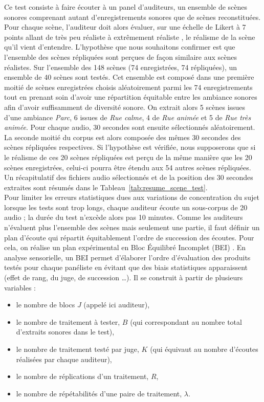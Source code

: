 Ce test consiste à faire écouter à un panel d'auditeurs, un ensemble de scènes sonores comprenant autant d'enregistrements sonores que de scènes reconstituées. Pour chaque scène, l'auditeur doit alors évaluer, sur une échelle de Likert à 7 points allant de \og très peu réaliste \fg{} à \og extrêmement réaliste \fg{}, le réalisme de la scène qu'il vient d'entendre. L'hypothèse que nous souhaitons confirmer est que l'ensemble des scènes répliquées sont perçues de façon similaire aux scènes réalistes.
Sur l'ensemble des 148 scènes (74 enregistrées, 74 répliquées), un ensemble de 40 scènes sont testés.
Cet ensemble est composé dans une première moitié de scènes enregistrées choisis aléatoirement parmi les 74 enregistrements tout en prenant soin d'avoir une répartition équitable entre les ambiance sonores afin d'avoir suffisamment de diversité sonore. On extrait alors 5 scènes issues d'une ambiance \textit{Parc}, 6 issues de \textit{Rue calme}, 4 de \textit{Rue animée} et 5 de \textit{Rue très animée}. Pour chaque audio, 30 secondes sont ensuite sélectionnés aléatoirement.
La seconde moitié du corpus est alors composée des mêmes 30 secondes des scènes répliquées respectives. Si l'hypothèse est vérifiée, nous supposerons que si le réalisme de ces 20 scènes répliquées est perçu de la même manière que les 20 scènes enregistrées, celui-ci pourra être étendu aux 54 autres scènes répliquées. Un récapitulatif des fichiers audio sélectionnés et de la position des 30 secondes extraites sont résumés dans le Tableau~\ref{tab:resume_scene_test}.\\



Pour limiter les erreurs statistiques dues aux variations de concentration du sujet lorsque les tests sont trop longs, chaque auditeur écoute un sous-corpus de 20 audio ; la durée du test n'excède alors pas 10 minutes. Comme les auditeurs n'évaluent plus l'ensemble des scènes mais seulement une partie, il faut définir un plan d'écoute qui répartit équitablement l'ordre de succession des écoutes. Pour cela, on réalise un plan expérimental en \og Bloc Équilibré Incomplet \fg{} (BEI) \cite{pages_blocs_2007}.
En analyse sensorielle, un BEI permet d'élaborer l'ordre d'évaluation des produits testés pour chaque panéliste en évitant que des biais statistiques apparaissent (effet de rang, du juge, de succession \dots). Il se construit à partir de plusieurs variables :

\begin{itemize}
\item le nombre de blocs $J$ (appelé ici auditeur),
\item le nombre de traitement à tester, $B$ (qui correspondant au nombre total d'extraits sonores dans le test),
\item le nombre de traitement testé par juge, $K$ (qui équivaut au nombre d'écoutes réalisées par chaque auditeur),
\item le nombre de réplications d'un traitement, $R$,
\item le nombre de répétabilités d'une paire de traitement, $\lambda$.\\
\end{itemize}

